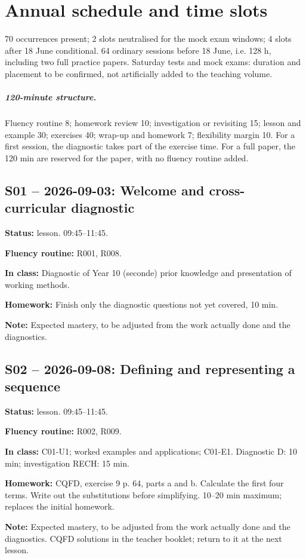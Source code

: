 \chapter{Annual schedule and time slots}\label{ANNUEL}
70 occurrences present; 2 slots neutralised for the mock exam windows; 4 slots after 18 June conditional. 64 ordinary sessions before 18 June, i.e. 128 h, including two full practice papers. Saturday tests and mock exams: duration and placement to be confirmed, not artificially added to the teaching volume.
\paragraph{120-minute structure.} Fluency routine 8; homework review 10; investigation or revisiting 15; lesson and example 30; exercises 40; wrap-up and homework 7; flexibility margin 10. For a first session, the diagnostic takes part of the exercise time. For a full paper, the 120 min are reserved for the paper, with no fluency routine added.
\section*{S01 -- 2026-09-03: Welcome and cross-curricular diagnostic}
\textbf{Status:} lesson. 09:45–11:45.\par\textbf{Fluency routine:} R001, R008.\par\textbf{In class:} Diagnostic of Year 10 (seconde) prior knowledge and presentation of working methods.\par\textbf{Homework:} Finish only the diagnostic questions not yet covered, 10 min.\par\textbf{Note:} Expected mastery, to be adjusted from the work actually done and the diagnostics.
\section*{S02 -- 2026-09-08: Defining and representing a sequence}
\textbf{Status:} lesson. 09:45–11:45.\par\textbf{Fluency routine:} R002, R009.\par\textbf{In class:} C01-U1; worked examples and applications; C01-E1. Diagnostic D: 10 min; investigation RECH: 15 min.\par\textbf{Homework:} CQFD, exercise 9 p. 64, parts a and b. Calculate the first four terms. Write out the substitutions before simplifying. 10–20 min maximum; replaces the initial homework.\par\textbf{Note:} Expected mastery, to be adjusted from the work actually done and the diagnostics. CQFD solutions in the teacher booklet; return to it at the next lesson.
